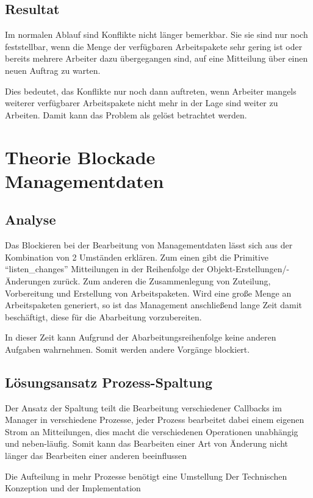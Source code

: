 \subsection{Resultat}
Im normalen Ablauf sind Konflikte nicht länger bemerkbar.
Sie sie sind nur noch feststellbar, wenn die Menge der verfügbaren Arbeitspakete
sehr gering ist oder bereits mehrere Arbeiter dazu übergegangen sind,
auf eine Mitteilung über einen neuen Auftrag zu warten.

Dies bedeutet, das Konflikte nur noch dann auftreten,
wenn Arbeiter mangels weiterer verfügbarer Arbeitspakete nicht mehr in der Lage sind weiter zu Arbeiten. Damit kann das Problem als gelöst betrachtet werden.

\section{Theorie Blockade Managementdaten}
\subsection{Analyse}
Das Blockieren bei der Bearbeitung von Managementdaten lässt sich
aus der Kombination von 2 Umständen erklären.
Zum einen gibt die Primitive ``listen\_changes'' Mitteilungen
in der Reihenfolge der Objekt-Erstellungen/-Änderungen zurück.
Zum anderen die Zusammenlegung von Zuteilung, Vorbereitung
und Erstellung von Arbeitspaketen.
Wird eine große Menge an Arbeitspaketen generiert,
so ist das Management anschließend lange Zeit damit beschäftigt,
diese für die Abarbeitung vorzubereiten.

In dieser Zeit kann Aufgrund der Abarbeitungsreihenfolge
keine anderen Aufgaben wahrnehmen.
Somit werden andere Vorgänge blockiert.

\subsection{Lösungsansatz Prozess-Spaltung}

Der Ansatz der Spaltung teilt die Bearbeitung verschiedener Callbacks im Manager
in verschiedene Prozesse, jeder Prozess bearbeitet dabei einem eigenen Strom an Mitteilungen, dies macht die verschiedenen Operationen unabhängig und neben-läufig.
Somit kann das Bearbeiten einer Art von Änderung nicht länger das Bearbeiten einer anderen beeinflussen 

Die Aufteilung in mehr Prozesse benötigt eine Umstellung Der Technischen Konzeption und der Implementation

